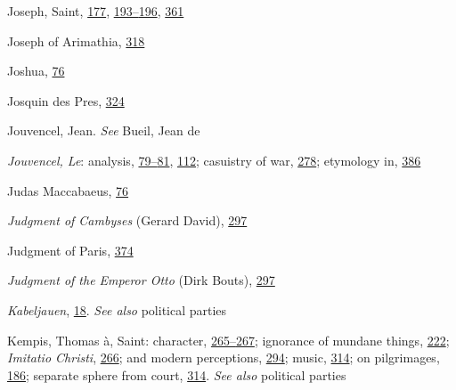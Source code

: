 Joseph, Saint,
\protect\hyperlink{13_Chapter_Six__THE_DEPICTION_OF_TH.xhtmlux5cux23page_177}{177},
\protect\hyperlink{13_Chapter_Six__THE_DEPICTION_OF_TH.xhtmlux5cux23page_193}{193--}\protect\hyperlink{13_Chapter_Six__THE_DEPICTION_OF_TH.xhtmlux5cux23page_196}{196},
\protect\hyperlink{21_Chapter_Thirteen__IMAGE_AND_WORD.xhtmlux5cux23page_361}{361}

Joseph of Arimathia,
\protect\hyperlink{20_ILLUSTRATIONS_FOLLOW_PAGE.xhtmlux5cux23page_318}{318}

Joshua,
\protect\hyperlink{10_Chapter_Three__THE_HEROIC_DREAM.xhtmlux5cux23page_76}{76}

Josquin des Pres,
\protect\hyperlink{20_ILLUSTRATIONS_FOLLOW_PAGE.xhtmlux5cux23page_324}{324}

Jouvencel, Jean. \emph{See} Bueil, Jean de

\emph{Jouvencel, Le}: analysis,
\protect\hyperlink{10_Chapter_Three__THE_HEROIC_DREAM.xhtmlux5cux23page_79}{79--}\protect\hyperlink{10_Chapter_Three__THE_HEROIC_DREAM.xhtmlux5cux23page_81}{81},
\protect\hyperlink{10_Chapter_Three__THE_HEROIC_DREAM.xhtmlux5cux23page_112}{112};
casuistry of war,
\protect\hyperlink{18_Chapter_Eleven__THE_FORMS_OF_THO.xhtmlux5cux23page_278}{278};
etymology in,
\protect\hyperlink{22_Chapter_Fourteen__THE_COMING_OF.xhtmlux5cux23page_386}{386}

Judas Maccabaeus,
\protect\hyperlink{10_Chapter_Three__THE_HEROIC_DREAM.xhtmlux5cux23page_76}{76}

\emph{Judgment of Cambyses} (Gerard David),
\protect\hyperlink{19_Chapter_Twelve__ART_IN_LIFE.xhtmlux5cux23page_297}{297}

Judgment of Paris,
\protect\hyperlink{21_Chapter_Thirteen__IMAGE_AND_WORD.xhtmlux5cux23page_374}{374}

\emph{Judgment of the Emperor Otto} (Dirk Bouts),
\protect\hyperlink{19_Chapter_Twelve__ART_IN_LIFE.xhtmlux5cux23page_297}{297}

\emph{Kabeljauen},
\protect\hyperlink{08_Chapter_One__THE_PASSIONATE_INTE.xhtmlux5cux23page_18}{18}.
\emph{See also} political parties

\protect\hypertarget{25_INDEX.xhtmlux5cux23page_460}{}{}Kempis, Thomas
à, Saint: character,
\protect\hyperlink{17_Chapter_Ten__THE_FAILURE_OF_IMAG.xhtmlux5cux23page_265}{265--}\protect\hyperlink{17_Chapter_Ten__THE_FAILURE_OF_IMAG.xhtmlux5cux23page_267}{267};
ignorance of mundane things,
\protect\hyperlink{15_Chapter_Eight__RELIGIOUS_EXCITAT.xhtmlux5cux23page_222}{222};
\emph{Imitatio Christi},
\protect\hyperlink{17_Chapter_Ten__THE_FAILURE_OF_IMAG.xhtmlux5cux23page_266}{266};
and modern perceptions,
\protect\hyperlink{19_Chapter_Twelve__ART_IN_LIFE.xhtmlux5cux23page_294}{294};
music,
\protect\hyperlink{20_ILLUSTRATIONS_FOLLOW_PAGE.xhtmlux5cux23page_314}{314};
on pilgrimages,
\protect\hyperlink{13_Chapter_Six__THE_DEPICTION_OF_TH.xhtmlux5cux23page_186}{186};
separate sphere from court,
\protect\hyperlink{20_ILLUSTRATIONS_FOLLOW_PAGE.xhtmlux5cux23page_314}{314}.
\emph{See also} political parties

